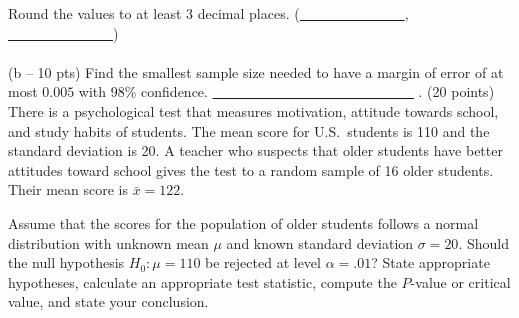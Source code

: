 \documentclass[12pt]{article}
\def\nn{\noindent}
\begin{document}
Round the values to at least 3 decimal places. {(\underline{\ \ \ \ \ \ \ \ \ \ \ \ \ \ \ }, \underline{\ \ \ \ \ \ \ \ \ \ \ \ \ \ \ })} \\ \\
(b -- 10 pts) Find the smallest sample size needed to have a margin of error of at most $0.005$ with 98\% confidence. {\bf \underline{\ \ \ \ \ \ \ \ \ \ \ \ \ \ \ \ \ \ \ \ \ \ \ \ \ }} 
\newpage
\nn 5. (20 points) There is a psychological test that measures motivation, attitude towards school,
and study habits of students. The mean score for U.S.~students is 110 and the standard deviation is 20.  
A teacher who suspects that older students have better attitudes toward school gives the test to a random sample of 
16 older students.  Their mean score is $\bar{x}=122$.

Assume that the scores for the population of older students follows a normal distribution with
unknown mean $\mu$ and known standard deviation $\sigma=20$.  Should the null hypothesis 
$H_0: \mu=110$ be rejected at 
level $\alpha=.01$?  State appropriate hypotheses, calculate an appropriate test statistic, compute 
the $P$-value or critical value, and state your conclusion.
\end{document}
